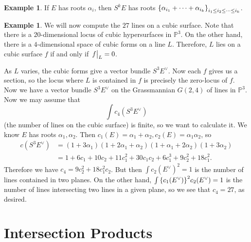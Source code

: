 \documentclass[leqno, openany]{memoir}
\theoremstyle{definition}
\newtheorem{exm}[thm]{Example}
\theoremstyle{remark}
\theoremstyle{plain}
\theoremstyle{definition}
\theoremstyle{remark}
\renewcommand{\P}{\mathbb{P}}
\begin{document}
\begin{exm}
    If $E$ has roots $\alpha_i$, then $S^k E$ has roots $\qty{\alpha_{i_1} + \cdots + \alpha_{i_k}}_{i_1 \leq i_2 \leq \cdots \leq i_k}$.
\end{exm}

\begin{exm}
    We will now compute the $27$ lines on a cubic surface. Note that there is a $20$-dimensional locus of cubic hypersurfaces in $\P^3$. On the other hand, there is a $4$-dimensional space of cubic forms on a line $L$. Therefore, $L$ lies on a cubic surface $f$ if and only if $\eval{f}_L = 0$.

    As $L$ varies, the cubic forms give a vector bundle $S^3 E^{\vee}$. Now each $f$ gives us a section, so the locus where $L$ is contained in $f$ is precisely the zero-locus of $f$. Now we have a vector bundle $S^3 E^{\vee}$ on the Grassmannian $G(2,4)$ of lines in $\P^3$. Now we may assume that
    \[ \int c_4(S^3 E^{\vee}) \]
    (the number of lines on the cubic surface) is finite, so we want to calculate it. We know $E$ has roots $\alpha_1, \alpha_2$. Then $c_1(E) = \alpha_1 + \alpha_2, c_2(E) =\alpha_1 \alpha_2$, so
    \begin{align*}
        c(S^3 E^{\vee}) &= (1+ 3 \alpha_1) (1 + 2 \alpha_1 + \alpha_2) (1 + \alpha_1 + 2 \alpha_2) (1+3 \alpha_2) \\
                        &= 1 + 6 c_1 + 10 c_2 + 11c_1^2 + 30 c_1c_2 + 6 c_1^3 + 9 c_2^2 + 18 c_1^2.
    \end{align*}
    Therefore we have $c_4 = 9 c_2^2 + 18c_1^2 c_2$. But then $\int { c_2 (E^{\vee}) }^2 = 1$ is the number of lines contained in two planes. On the other hand, $\int \qty{c_1(E^{\vee})}^2 c_2(E^{\vee}) = 1$ is the number of lines intersecting two lines in a given plane, so we see that $c_4 = 27$, as desired.
\end{exm}

\section{Intersection Products}%
\label{sec:intersection_products}
\end{document}
